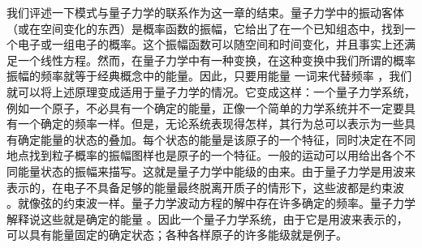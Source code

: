 我们评述一下模式与量子力学的联系作为这一章的结束。量子力学中的振动客体（或在空间变化的东西）是概率函数的振幅，它给出了在一个已知组态中，找到一个电子或一组电子的概率。这个振幅函数可以随空间和时间变化，并且事实上还满足一个线性方程。然而，在量子力学中有一种变换，在这种变换中我们所谓的概率振幅的频率就等于经典概念中的能量。因此，只要用能量 一词来代替频率 ，我们就可以将上述原理变成适用于量子力学的情况。它变成这样：一个量子力学系统，例如一个原子，不必具有一个确定的能量，正像一个简单的力学系统并不一定要具有一个确定的频率一样。但是，无论系统表现得怎样，其行为总可以表示为一些具有确定能量的状态的叠加。每个状态的能量是该原子的一个特征，同时决定在不同地点找到粒子概率的振幅图样也是原子的一个特征。一般的运动可以用给出各个不同能量状态的振幅来描写。这就是量子力学中能级的由来。由于量子力学是用波来表示的，在电子不具备足够的能量最终脱离开质子的情形下，这些波都是约束波 。就像弦的约束波一样。量子力学波动方程的解中存在许多确定的频率。量子力学解释说这些就是确定的能量 。因此一个量子力学系统，由于它是用波来表示的，可以具有能量固定的确定状态；各种各样原子的许多能级就是例子。